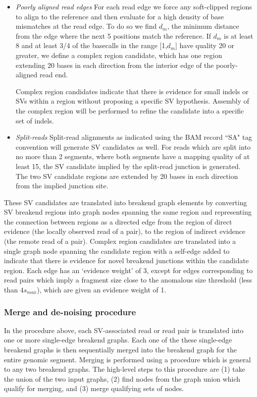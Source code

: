 \documentclass{article}
\begin{document}
\begin{itemize}
\item \textit{Poorly aligned read edges} For each read edge we force any soft-clipped regions to align to the reference and then evaluate for a high density of base mismatches at the read edge. To do so we find $d_{m}$, the minimum distance from the edge where the next 5 positions match the reference. If $d_{m}$ is at least 8 and at least 3/4 of the basecalls in the range [1,$d_{m}$] have quality 20 or greater, we define a complex region candidate, which has one region extending 20 bases in each direction from the interior edge of the poorly-aligned read end.

Complex region candidates indicate that there is evidence for small indels or SVs within a region without proposing a specific SV hypothesis. Assembly of the complex region will be performed to refine the candidate into a specific set of indels.

\item \textit{Split-reads} Split-read alignments as indicated using the BAM record ``SA" tag convention will generate SV candidates as well. For reads which are split into no more than 2 segments, where both segments have a mapping quality of at least 15, the SV candidate implied by the split-read junction is generated. The two SV candidate regions are extended by 20 bases in each direction from the implied junction site.

\end{itemize}

These SV candidates are translated into breakend graph elements by converting SV breakend regions into graph nodes spanning the same region and representing the connection between regions as a directed edge from the region of direct evidence (the locally observed read of a pair), to the region of indirect evidence (the remote read of a pair). Complex region candidates are translated into a single graph node spanning the candidate region with a self-edge added to indicate that there is evidence for novel breakend junctions within the candidate region. Each edge has an `evidence weight' of 3, except for edges corresponding to read pairs which imply a fragment size close to the anomalous size threshold (less than $4s_{max}$), which are given an evidence weight of 1.

\subsubsection{Merge and de-noising procedure}

In the procedure above, each SV-associated read or read pair is translated into one or more single-edge breakend graphs. Each one of the these single-edge breakend graphs is then sequentially merged into the breakend graph for the entire genomic segment. Merging is performed using a procedure which is general to any two breakend graphs. The high-level steps to this procedure are (1) take the union of the two input graphs, (2) find nodes from the graph union which qualify for merging, and (3) merge qualifying sets of nodes.
\end{document}
